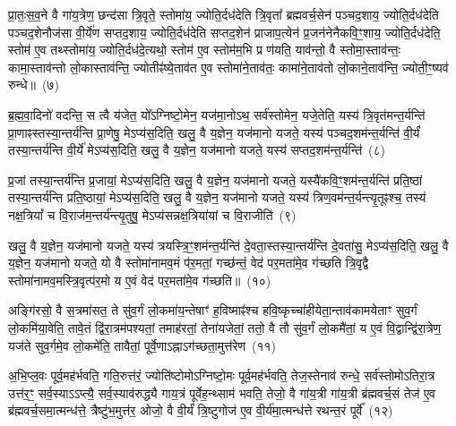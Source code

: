 {\anuvakamend[{अस्थू॑रि॒रोष॑धीषु ज्येष्ठय॒ज्ञ इति॑ बृ॒हद॑नु॒ष्टुप्छन्दः॒ प्रति॑ष्ठिता॒ नव॑ च}]}

प्रा॒तः॒स॒व॒ने वै गा॑य॒त्रेण॒ छन्द॑सा त्रि॒वृते॒ स्तोमा॑य॒ ज्योति॒र्दध॑देति त्रि॒वृता᳚ ब्रह्मवर्च॒सेन॑ पञ्चद॒शाय॒ ज्योति॒र्दध॑देति पञ्चद॒शेनौज॑सा वी॒र्ये॑ण सप्तद॒शाय॒ ज्योति॒र्दध॑देति सप्तद॒शेन॑ प्राजाप॒त्येन॑ प्र॒जन॑नेनैकवि॒ꣳ॒शाय॒ ज्योति॒र्दध॑देति॒ स्तोम॑ ए॒व तथ्स्तोमा॑य॒ ज्योति॒र्दध॑दे॒त्यथो॒ स्तोम॑ ए॒व स्तोम॑म॒भि प्र ण॑यति॒ याव॑न्तो॒ वै स्तोमा॒स्ताव॑न्तः॒ कामा॒स्ताव॑न्तो लो॒कास्ताव॑न्ति॒ ज्योतीꣴ॑ष्ये॒ताव॑त ए॒व स्तोमा॑ने॒ताव॑तः॒ कामा॑ने॒ताव॑तो लो॒काने॒ताव॑न्ति॒ ज्योती॒ꣳ॒ष्यव॑ रुन्धे॥~(७)\ip

{\anuvakamend[{ताव॑न्तो लो॒कास्त्रयो॑दश च}]}

ब्र॒ह्म॒वा॒दिनो॑ वदन्ति॒ स त्वै य॑जेत॒ यो᳚\-ऽग्निष्टो॒मेन॒ यज॑मा॒नो\-ऽथ॒ सर्व॑स्तोमेन॒ यजे॒तेति॒ यस्य॑ त्रि॒वृत॑मन्त॒र्यन्ति॑ प्रा॒णाꣴस्तस्या॒न्तर्य॑न्ति प्रा॒णेषु॒ मे\-ऽप्य॑स॒दिति॒ खलु॒ वै य॒ज्ञेन॒ यज॑मानो यजते॒ यस्य॑ पञ्चद॒शम॑न्त॒र्यन्ति॑ वी॒र्यं॑ तस्या॒न्तर्य॑न्ति वी॒र्ये॑ मे\-ऽप्य॑स॒दिति॒ खलु॒ वै य॒ज्ञेन॒ यज॑मानो यजते॒ यस्य॑ सप्तद॒शम॑न्त॒र्यन्ति॑~(८)\ip

प्र॒जां तस्या॒न्तर्य॑न्ति प्र॒जायां॒ मे\-ऽप्य॑स॒दिति॒ खलु॒ वै य॒ज्ञेन॒ यज॑मानो यजते॒ यस्यै॑कवि॒ꣳ॒शम॑न्त॒र्यन्ति॑ प्रति॒ष्ठां तस्या॒न्तर्य॑न्ति प्रति॒ष्ठायां॒ मे\-ऽप्य॑स॒दिति॒ खलु॒ वै य॒ज्ञेन॒ यज॑मानो यजते॒ यस्य॑ त्रिण॒वम॑न्त॒र्यन्त्यृ॒तूꣴश्च॒ तस्य॑ नक्ष॒त्रियां᳚ च वि॒राज॑म॒न्तर्य॑न्त्यृ॒तुषु॒ मे\-ऽप्य॑सन्नक्ष॒त्रिया॑यां च वि॒राजीति॑~(९)\ip

खलु॒ वै य॒ज्ञेन॒ यज॑मानो यजते॒ यस्य॑ त्रयस्त्रि॒ꣳ॒शम॑न्त॒र्यन्ति॑ दे॒वता॒स्तस्या॒न्तर्य॑न्ति दे॒वता॑सु॒ मे\-ऽप्य॑स॒दिति॒ खलु॒ वै य॒ज्ञेन॒ यज॑मानो यजते॒ यो वै स्तोमा॑नामव॒मं प॑र॒मतां॒ गच्छ॑न्तं॒ वेद॑ पर॒मता॑मे॒व ग॑च्छति त्रि॒वृद्वै स्तोमा॑नामव॒म\-स्त्रि॒वृत्प॑र॒मो य ए॒वं वेद॑ पर॒मता॑मे॒व ग॑च्छति॥~(१०)\ip

{\anuvakamend[{स॒प्त॒द॒शम॑न्त॒र्यन्ति॑ वि॒राजीति॒ चतु॑श्चत्वारिꣳशच्च}]}

अङ्गि॑रसो॒ वै स॒त्रमा॑सत॒ ते सु॑व॒र्गं लो॒कमा॑य॒न्तेषाꣳ॑ ह॒विष्माꣴ॑श्च हवि॒ष्कृच्चा॑हीयेता॒न्ताव॑कामयेताꣳ सुव॒र्गं लो॒कमि॑या॒वेति॒ तावे॒तं द्वि॑रा॒त्रम॑पश्यतां॒ तमाह॑रतां॒ तेना॑यजेतां॒ ततो॒ वै तौ सु॑व॒र्गं लो॒कमै॑तां॒ य ए॒वं वि॒द्वान्द्वि॑रा॒त्रेण॒ यज॑ते सुव॒र्गमे॒व लो॒कमे॑ति॒ तावैतां॒ पूर्वे॒णा\-ऽह्ना\-ऽग॑च्छता॒मुत्त॑रेण~(११)\ip

अ॒भि॒प्ल॒वः पूर्व॒मह॑र्भवति॒ गति॒रुत्त॑रं॒ ज्योति॑ष्टोमो\-ऽग्निष्टो॒मः पूर्व॒मह॑र्भवति॒ तेज॒स्तेनाव॑ रुन्धे॒ सर्व॑स्तोमो\-ऽतिरा॒त्र उत्त॑र॒ꣳ॒ सर्व॒स्या\-ऽऽप्त्यै॒ सर्व॒स्याव॑रुद्ध्यै गाय॒त्रं पूर्वेह॒न्थ्साम॑ भवति॒ तेजो॒ वै गा॑य॒त्री गा॑य॒त्री ब्र॑ह्मवर्च॒सं तेज॑ ए॒व ब्र॑ह्मवर्च॒स\-मा॒त्मन्ध॑त्ते॒ त्रैष्टु॑भ॒मुत्त॑र॒ ओजो॒ वै वी॒र्यं॑ त्रि॒ष्टुगोज॑ ए॒व वी॒र्य॑मा॒त्मन्ध॑त्ते रथन्त॒रं पूर्वे᳚~(१२)\ip


